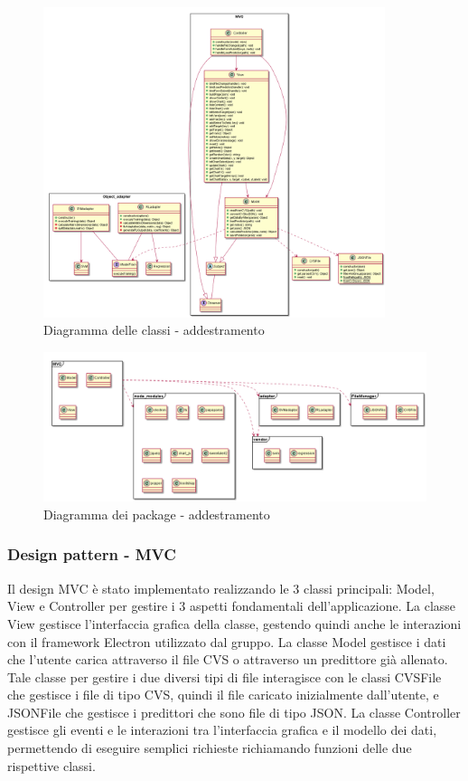 \documentclass[../manuale-sviluppatore.tex]{subfiles}
\begin{document}
\begin{figure}[H]
   \begin{center}
        \includegraphics[width=10cm]{img/classDiagramTA.png}
        \caption{Diagramma delle classi - addestramento}
        \label{fig:diagramma_classi}
    \end{center}
\end{figure}

\begin{figure}[H]
    \begin{center}
         \includegraphics[width=15cm]{img/packagesDiagramTA.png}
         \caption{Diagramma dei package - addestramento}
         \label{fig:daa}
     \end{center}
 \end{figure}

 

\subsubsection{Design pattern - MVC}
\label{ssec:design_pattern_mvc}
Il design MVC è stato implementato realizzando le 3 classi principali: Model, View e Controller per gestire i 3 aspetti fondamentali dell'applicazione.
La classe View gestisce l'interfaccia grafica della classe, gestendo quindi anche le interazioni con il framework Electron utilizzato dal gruppo.
La classe Model gestisce i dati che l'utente carica attraverso il file CVS o attraverso un predittore già allenato. Tale classe per gestire i due diversi tipi di file interagisce con le classi
CVSFile che gestisce i file di tipo CVS, quindi il file caricato inizialmente dall'utente, e JSONFile che gestisce i predittori che sono file di tipo JSON.
La classe Controller gestisce gli eventi e le interazioni tra l'interfaccia grafica e il modello dei dati, permettendo di eseguire semplici richieste richiamando funzioni delle due rispettive classi.
\end{document}
